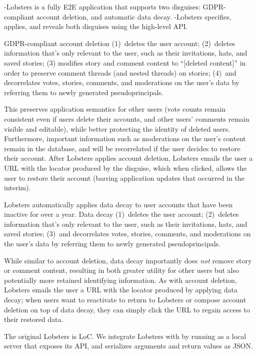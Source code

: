 \sys-Lobsters is a fully E2E application that supports two disguises: GDPR-compliant account deletion, and automatic data decay.
\sys-Lobsters specifies, applies, and reveals both disguises using the high-level \sys API.

GDPR-compliant account deletion 
%
(1)~deletes the user account;
%
(2)~deletes information that's only relevant to the user, such as their invitations, hats, and saved
stories;
%
(3) modifies story and comment content to ``[deleted content]'' in order to preserve comment threads
(and nested threads) on stories;
%
(4)~and decorrelates votes, stories, comments, and moderations on the user's data by referring them
to newly generated pseudoprincipals.
%

This preserves application semantics for other users (\eg vote counts remain consistent even if
users delete their accounts, and other users' comments remain visible and editable), while better
protecting the identity of deleted users.  Furthermore, important information such as moderations on
the user's content remain in the database, and will be recorrelated if the user decides to restore
their account.  After Lobsters applies account deletion, Lobsters emails the user a URL with the
locator produced by the disguise, which when clicked, allows the user to restore their account
(barring application updates that occurred in the interim).

Lobsters automatically applies data decay to user accounts that have been inactive for over a year.
Data decay 
%
(1)~deletes the user account;
%
(2)~deletes information that's only relevant to the user, such as their invitations, hats, and saved
stories;
%
(3)~and decorrelates votes, stories, comments, and moderations on the user's data by referring them
to newly generated pseudoprincipals.
%

While similar to account deletion, data decay importantly does \emph{not} remove story or comment
content, resulting in both greater utility for other users but also potentially more retained
identifying information.  As with account deletion, Lobsters emails the user a URL with the locator
produced by applying data decay; when users want to reactivate to return to Lobsters or compose
account deletion on top of data decay, they can simply click the URL to regain access to their
restored data.

The original Lobsters is LoC. We integrate Lobsters with \sys by running \sys as a local
server that exposes its API, and serializes arguments and return values as JSON.


